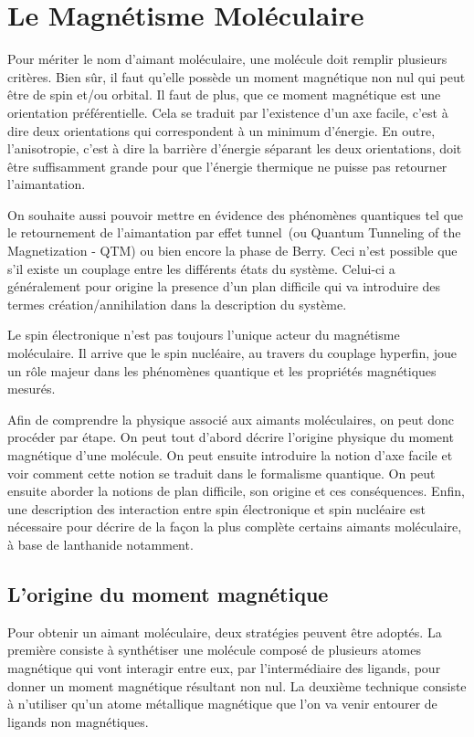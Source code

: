 \chapter{Le Magnétisme Moléculaire}

Pour mériter le nom d'aimant moléculaire, une molécule doit remplir plusieurs critères. Bien s\^ur, il faut qu'elle possède un moment magnétique non nul qui peut \^etre de spin et/ou orbital. Il faut de plus, que ce moment magnétique est une orientation préférentielle. Cela se traduit par l'existence d'un axe facile, c'est à dire deux orientations qui correspondent à un minimum d'énergie. En outre, l'anisotropie, c'est à dire la barrière d'énergie séparant les deux orientations, doit \^etre suffisamment grande pour que l'énergie thermique ne puisse pas retourner l'aimantation.

On souhaite aussi pouvoir mettre en évidence des phénomènes quantiques tel que le retournement de l'aimantation par effet tunnel~(ou Quantum Tunneling of the Magnetization - QTM) ou bien encore la phase de Berry. Ceci n'est possible que s'il existe un couplage entre les différents états du système. Celui-ci a généralement pour origine la presence d'un plan difficile qui va introduire des termes création/annihilation dans la description du système.

Le spin électronique n'est pas toujours l'unique acteur du magnétisme moléculaire. Il arrive que le spin nucléaire, au travers du couplage hyperfin, joue un r\^ole majeur dans les phénomènes quantique et les propriétés magnétiques mesurés.

Afin de comprendre la physique associé aux aimants moléculaires, on peut donc procéder par étape. On peut tout d'abord décrire l'origine physique du moment magnétique d'une molécule. On peut ensuite introduire la notion d'axe facile et voir comment cette notion se traduit dans le formalisme quantique. On peut ensuite aborder la notions de plan difficile, son origine et ces conséquences. Enfin, une description des interaction entre spin électronique et spin nucléaire est nécessaire pour décrire de la façon la plus complète certains aimants moléculaire, à base de lanthanide notamment.

\section{L'origine du moment magnétique}
Pour obtenir un aimant moléculaire, deux stratégies peuvent être adoptés. La première consiste à synthétiser une molécule composé de plusieurs atomes magnétique qui vont interagir entre eux, par l'intermédiaire des ligands, pour donner un moment magnétique résultant non nul. La deuxième technique consiste à n'utiliser qu'un atome métallique magnétique que l'on va venir entourer de ligands non magnétiques.


